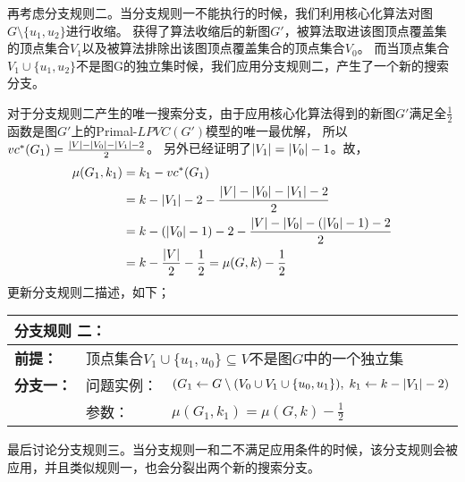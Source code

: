 \vspace{0.5cm}
再考虑分支规则二。当分支规则一不能执行的时候，我们利用核心化算法对图$G \setminus \{u_1, u_2\}$进行收缩。
获得了算法收缩后的新图$G'$，被算法取进该图顶点覆盖集的顶点集合$V_1$以及被算法排除出该图顶点覆盖集合的顶点集合$V_0$。
而当顶点集合$V_1 \cup \{u_1, u_2\}$不是图G的独立集时候，我们应用分支规则二，产生了一个新的搜索分支。

对于分支规则二产生的唯一搜索分支，由于应用核心化算法得到的新图$G'$满足全$\frac{1}{2}$函数是图$G'$上的Primal-$LPVC(G')$模型的唯一最优解，
所以$vc^*(G_1) = \frac{\left\vert V \right\vert - \left\vert V_0 \right\vert - \left\vert V_1 \right\vert - 2}{2}$。
另外已经证明了$\left\vert V_1 \right\vert = \left\vert V_0 \right\vert - 1$。故，
\begin{equation*} \begin{aligned}
    \mu(G_1, k_1) & = k_1 - vc^*(G_1)  \\
                  & = k - \left\vert V_1 \right\vert - 2 - \frac{\left\vert V \right\vert - \left\vert V_0 \right\vert - \left\vert V_1 \right\vert - 2}{2} \\
                  & = k - (\left\vert V_0 \right\vert - 1) - 2 - \frac{\left\vert V \right\vert - \left\vert V_0 \right\vert - (\left\vert V_0 \right\vert - 1) - 2}{2} \\
                  & = k - \frac{\left\vert V \right\vert}{2} - \frac{1}{2} = \mu(G, k) - \frac{1}{2}
\end{aligned} \end{equation*}
更新分支规则二描述，如下；\\

\begin{tabular}{ p{0.12\headwidth} | p{0.12\headwidth}p{0.66\headwidth} }
  \multicolumn{3}{l}{ \textbf{分支规则 二：} }\\
  \hline
  \textbf{前提：}  & \multicolumn{2}{l}{顶点集合$V_1 \cup \{u_1, u_0\}\subseteq V$不是图$G$中的一个独立集}\\
  \hline
  \textbf{分支一：} & 问题实例：&$(G_1 \leftarrow G \setminus (V_0 \cup V_1 \cup \{u_0, u_1\}),\; k_1 \leftarrow k - \left\vert V_1 \right\vert - 2)$ \\
                    & 参数：&$\mu(G_1, k_1) = \mu(G, k) - \frac{1}{2}$\\
  \hline
\end{tabular} \vspace{0.5cm}

\vspace{0.5cm}
最后讨论分支规则三。当分支规则一和二不满足应用条件的时候，该分支规则会被应用，并且类似规则一，也会分裂出两个新的搜索分支。


